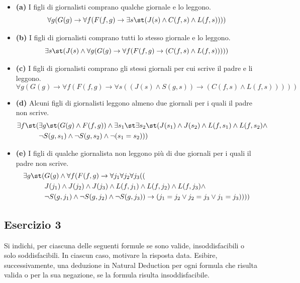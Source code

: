 \begin{itemize}
    \item \textbf{(a)} I figli di giornalisti comprano qualche giornale e lo leggono.
    \[ \forall g(G(g)\rightarrow\forall f(F(f,g)\rightarrow \exists s\st (J(s)\wedge C(f,s)\wedge L(f,s)))) \]
    
    \item \textbf{(b)} I figli di giornalisti comprano tutti lo stesso giornale e lo leggono.
    \[ \exists s\st (J(s)\wedge\forall g(G(g)\rightarrow\forall f(F(f,g)\rightarrow(C(f,s)\wedge L(f,s))))) \]
    
    \item \textbf{(c)} I figli di giornalisti comprano gli stessi giornali per cui scrive il padre e li leggono.
    \[ \forall g(G(g)\rightarrow\forall f(F(f,g)\rightarrow\forall s((J(s)\wedge S(g,s))\rightarrow(C(f,s)\wedge L(f,s))))) \]
    
    \item \textbf{(d)} Alcuni figli di giornalisti leggono almeno due giornali per i quali il padre non scrive.
    \begin{align*} 
    \exists f\st (&\exists g\st (G(g)\wedge F(f,g))\wedge \exists s_1\st \exists s_2\st (J(s_1)\wedge J(s_2)\wedge L(f,s_1)\wedge L(f,s_2)\wedge \\ 
    & \neg S(g,s_1)\wedge\neg S(g,s_2)\wedge\neg(s_1=s_2))) 
    \end{align*}
    
    \item \textbf{(e)} I figli di qualche giornalista non leggono più di due giornali per i quali il padre non scrive.
    \begin{align*}
    \exists g\st (& G(g)\wedge\forall f(F(f,g)\rightarrow\forall j_1\forall j_2\forall j_3((\\
                  & J(j_1)\wedge J(j_2)\wedge J(j_3)\wedge L(f,j_1)\wedge L(f,j_2)\wedge L(f,j_3)\wedge \\
                  & \neg S(g,j_1)\wedge\neg S(g,j_2)\wedge\neg S(g,j_3))\rightarrow (j_1=j_2 \vee j_2=j_3 \vee j_1=j_3))))
    \end{align*}
\end{itemize}

\vspace{1cm}
\subsection*{Esercizio 3}

Si indichi, per ciascuna delle seguenti formule se sono valide, insoddisfacibili o solo soddisfacibili. In ciascun caso, motivare la risposta data.
Esibire, successivamente, una deduzione in Natural Deduction per ogni formula che risulta valida o per la sua negazione, se la formula risulta insoddisfacibile.

